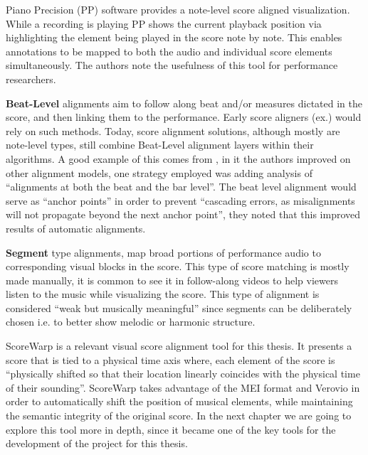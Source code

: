 Piano Precision (PP) software provides a note-level score aligned visualization. While a recording is playing PP shows the current playback position via highlighting the element being played in the score note by note. This enables annotations to be mapped to both the audio and individual score elements simultaneously. The authors note the usefulness of this tool for performance researchers. \citep{jiangPIANOPRECISIONADVANCING2025} 

\textbf{Beat-Level} alignments aim to follow along beat and/or measures dictated in the score, and then linking them to the performance. Early score aligners (ex.\citet{duanSoundprismOnlineSystem2011}) would rely on such methods. Today, score alignment solutions, although mostly are note-level types, still combine Beat-Level alignment layers within their algorithms. A good example of this comes from \citet{peterAutomaticNoteLevelScoretoPerformance2023}, in it the authors improved on other alignment models, one strategy employed was adding analysis of ``alignments at both the beat and the bar level''. The beat level alignment would serve as ``anchor points'' in order to prevent ``cascading errors, as misalignments will not propagate beyond the next anchor point'', they noted that this improved results of automatic alignments.

\textbf{Segment} type alignments, map broad portions of performance audio to corresponding visual blocks in the score. This type of score matching is mostly made manually, it is common to see it in follow-along videos to help viewers listen to the music while visualizing the score. This type of alignment is considered ``weak but musically meaningful'' \citep{jungUnifiedCrossmodalTranslation2026a} since segments can be deliberately chosen i.e. to better show melodic or harmonic structure. 


ScoreWarp is a relevant visual score alignment tool for this thesis. It presents a score that is tied to a physical time axis where, each element of the score is ``physically shifted so that their location linearly coincides with the physical time of their sounding''\citep{goeblLetsScoreWarpAgain2025a}. ScoreWarp takes advantage of the MEI format and Verovio in order to automatically shift the position of musical elements, while maintaining the semantic integrity of the original score. In the next chapter we are going to explore this tool more in depth, since it became one of the key tools for the development of the project for this thesis. 

